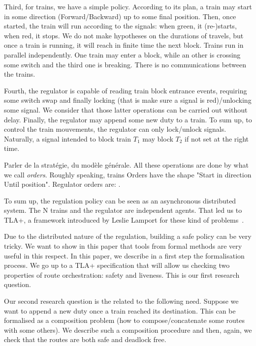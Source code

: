 \documentclass[runningheads]{llncs}
\begin{document}
  Third, for trains, we have a simple policy.  According to its plan, a train may start in some direction (Forward/Backward) up to some final position. Then, once started, the train will run according to the signals: when green, it (re-)starts, when red, it stops.  We do not make hypotheses on the durations of travels, but once a train is running, it will reach in finite time the next block. Trains run in parallel independently. One train may enter a block, while an other is crossing some switch and the third one is breaking. There is no communications between the trains.

Fourth,  the regulator is capable of reading train block entrance events, requiring some switch swap and finally locking (that is make sure a signal is red)/unlocking some signal. We consider that those latter operations can be carried out without delay. Finally, the regulator may append some new duty to a train. To sum up, to control the train mouvements, the regulator can only lock/unlock signals. Naturally, a signal intended to block train $T_1$ may block $T_2$ if not set at the right time.   
 
 Parler de la stratégie, du modèle générale. All these operations are done by what we call  \emph{orders}. Roughly speaking, trains Orders have the shape "Start in direction Until position". Regulator orders are: . 
 
 
 To sum up, the regulation policy can be seen as an asynchronous distributed system. The N trains and the regulator are independent agents. That led us to TLA+, a framework introduced by Leslie Lamport for these kind of problems~\cite{Lamport}.  
 
 
 
Due to the distributed nature of the regulation, building a safe policy can be very tricky. We want to show in this paper that tools from formal methods are very useful in this respect.  In this paper, we describe in  a first step the formalisation process. We go up to a TLA+ specification that will allow us checking two properties of route orchestration: safety and liveness. This is our first research question. 

Our second research question is the related to the following need. Suppose we want to append a new duty once a train reached its destination. This can be formalised as a composition problem (how to compose/concatenate some routes with some others). We describe such a composition procedure and then, again, we check that the routes are both safe and deadlock free. 
\end{document}
